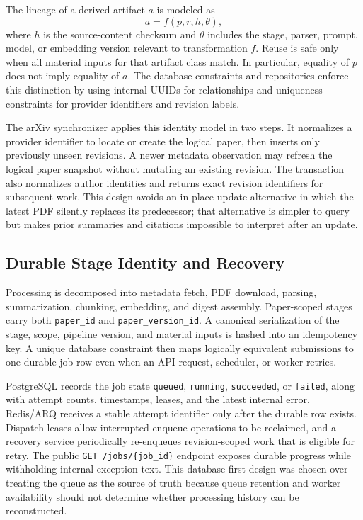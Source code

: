 The lineage of a derived artifact \(a\) is modeled as
\[
  a = f(p,r,h,\theta),
\]
where \(h\) is the source-content checksum and \(\theta\) includes the stage, parser, prompt, model, or embedding version relevant to transformation \(f\). Reuse is safe only when all material inputs for that artifact class match. In particular, equality of \(p\) does not imply equality of \(a\). The database constraints and repositories enforce this distinction by using internal UUIDs for relationships and uniqueness constraints for provider identifiers and revision labels.

The arXiv synchronizer applies this identity model in two steps. It normalizes a provider identifier to locate or create the logical paper, then inserts only previously unseen revisions. A newer metadata observation may refresh the logical paper snapshot without mutating an existing revision. The transaction also normalizes author identities and returns exact revision identifiers for subsequent work. This design avoids an in-place-update alternative in which the latest PDF silently replaces its predecessor; that alternative is simpler to query but makes prior summaries and citations impossible to interpret after an update.

\subsection{Durable Stage Identity and Recovery}

Processing is decomposed into metadata fetch, PDF download, parsing, summarization, chunking, embedding, and digest assembly. Paper-scoped stages carry both \texttt{paper\_id} and \texttt{paper\_version\_id}. A canonical serialization of the stage, scope, pipeline version, and material inputs is hashed into an idempotency key. A unique database constraint then maps logically equivalent submissions to one durable job row even when an API request, scheduler, or worker retries.

PostgreSQL records the job state \texttt{queued}, \texttt{running}, \texttt{succeeded}, or \texttt{failed}, along with attempt counts, timestamps, leases, and the latest internal error. Redis/ARQ receives a stable attempt identifier only after the durable row exists. Dispatch leases allow interrupted enqueue operations to be reclaimed, and a recovery service periodically re-enqueues revision-scoped work that is eligible for retry. The public \texttt{GET /jobs/\{job\_id\}} endpoint exposes durable progress while withholding internal exception text. This database-first design was chosen over treating the queue as the source of truth because queue retention and worker availability should not determine whether processing history can be reconstructed.

